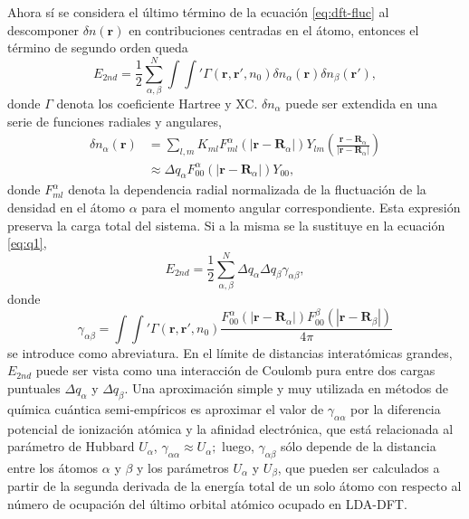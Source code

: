 \begin{enumerate}
        Ahora sí se considera el último término de la ecuación \ref{eq:dft-fluc}
        al descomponer $\delta n(\mathbf{r})$ en contribuciones centradas en el
        átomo, entonces el término de segundo orden queda
        \begin{equation}\label{eq:q1}
        E_{2nd} = \frac{1}{2} \sum_{\alpha, \beta}^N \int \int' \Gamma(\mathbf{r}, \mathbf{r}', n_0) \delta n_{\alpha}(\mathbf{r}) \delta n_{\beta}(\mathbf{r}'),
        \end{equation}
        donde $\Gamma$ denota los coeficiente Hartree y XC. $\delta n_{\alpha}$
        puede ser extendida en una serie de funciones radiales y angulares,
        \begin{equation*}
            \begin{aligned}
                \delta n_{\alpha}(\mathbf{r}) &= \sum_{l,m} K_{ml} F_{ml}^{\alpha}(|\mathbf{r} - \mathbf{R}_{\alpha}|) Y_{lm} \left(\frac{\mathbf{r}-\mathbf{R}_{\alpha}}{|\mathbf{r}-\mathbf{R}_{\alpha}|}\right) \\
                &\approx \Delta q_{\alpha} F_{00}^{\alpha}(|\mathbf{r} - \mathbf{R}_{\alpha}|) Y_{00},
            \end{aligned}
        \end{equation*}
        donde $F_{ml}^{\alpha}$ denota la dependencia radial normalizada de la
        fluctuación de la densidad en el átomo $\alpha$ para el momento angular
        correspondiente. Esta expresión preserva la carga total del sistema.
        Si a la misma se la sustituye en la ecuación \ref{eq:q1},
        \begin{equation*}
        E_{2nd} = \frac{1}{2} \sum_{\alpha,\beta}^N \Delta q_{\alpha} \Delta q_{\beta} \gamma_{\alpha\beta},
        \end{equation*}
        donde
        \begin{equation*}
        \gamma_{\alpha\beta} = \int \int' \Gamma(\mathbf{r},\mathbf{r}',n_0)\frac{F_{00}^{\alpha}(|\mathbf{r} - \mathbf{R}_{\alpha}|)F_{00}^{\beta}(|\mathbf{r} - \mathbf{R}_{\beta}|)}{4 \pi}
        \end{equation*}
        se introduce como abreviatura. En el límite de distancias interatómicas
        grandes, $E_{2nd}$ puede ser vista como una interacción de Coulomb pura
        entre dos cargas puntuales $\Delta q_{\alpha}$ y $\Delta q_{\beta}$. Una
        aproximación simple y muy utilizada en métodos de química cuántica 
        semi-empíricos es aproximar el valor de $\gamma_{\alpha\alpha}$ por la 
        diferencia potencial de ionización atómica y la afinidad electrónica, que
        está relacionada al parámetro de Hubbard $U_{\alpha}$, 
        $\gamma_{\alpha\alpha} \approx U_{\alpha};$ luego, $\gamma_{\alpha\beta}$ 
        sólo depende de la distancia entre los átomos $\alpha$ y $\beta$ y los 
        parámetros $U_{\alpha}$ y $U_{\beta}$, que pueden ser calculados a partir 
        de la segunda derivada de la energía total de un solo átomo con respecto 
        al número de ocupación del último orbital atómico ocupado en LDA-DFT.


\end{enumerate}
